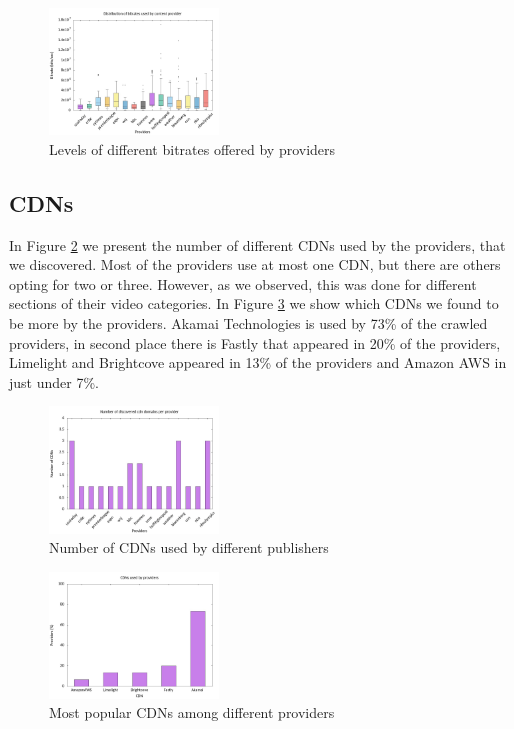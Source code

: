 \documentclass[]{sig-alternate-10pt}
\begin{document}
\begin{figure}
\centering
\includegraphics[width=0.4\textwidth]{bitrate_box_plot.jpg}
\caption{Levels of different bitrates offered by providers}
\label{fig:bitrate2}
\end{figure}

\hypertarget{cdns}{%
\subsection{CDNs}\label{cdns}}

In Figure \ref{fig:cdn1} we present the number of different CDNs used by
the providers, that we discovered. Most of the providers use at most one
CDN, but there are others opting for two or three. However, as we
observed, this was done for different sections of their video
categories. In Figure \ref{fig:cdn2} we show which CDNs we found to be
more by the providers. Akamai Technologies is used by 73\% of the
crawled providers, in second place there is Fastly that appeared in 20\%
of the providers, Limelight and Brightcove appeared in 13\% of the
providers and Amazon AWS in just under 7\%.

\begin{figure}
\centering
\includegraphics[width=0.4\textwidth]{cdn_bar_plot1.jpg}
\caption{Number of CDNs used by different publishers}
\label{fig:cdn1}
\end{figure}
\begin{figure}
\centering
\includegraphics[width=0.4\textwidth]{cdn_bar_plot2.jpg}
\caption{Most popular CDNs among different providers}
\label{fig:cdn2}
\end{figure}
\end{document}
